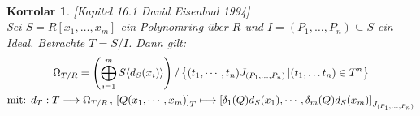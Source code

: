 \documentclass[10pt,a4paper]{report}
\newcommand{\ModulsOfDifferenzials}{David Eisenbud 1994}
\newcounter{Aussage}[chapter]
\newtheorem{korrolar}[Aussage]{Korrolar}
\newcommand{\function}[5]{\nolinebreak{#1:#2 \longrightarrow #3 \, , \, #4 \longmapsto #5}}
\newcommand{\divR}[2]{\Omega_{#1/#2}}
\newcommand{\divf}[1]{d_{#1}}
\begin{document}
\ \\
\newpage
\begin{korrolar}\label{Derivtion mittels Jakobimatrizen} \textit{[Kapitel 16.1 \ModulsOfDifferenzials]}\\
Sei  $S = R[x_1, \dots ,x_m]$ ein Polynomring über $R$ und $I = (P_1,\dots, P_n) \subseteq S$ ein Ideal. Betrachte $T = S/I$. Dann gilt:
\begin{gather*}
\divR{T}{R} = \left( \bigoplus_{i = 1}^m S \langle \divf{S}(x_i) \rangle \right) / \left\lbrace (t_1, \cdots, t_n) J_{(P_1,\dots, P_n)} \, \vert (t_1 , \dots t_n) \in T^n \right\rbrace\\
\text{mit: } 
\function{\divf{T}}{T}{\divR{T}{R}}{\left[Q(x_1,\cdots, x_m)\right]_T}{\left[\delta_1(Q)\divf{S}(x_1), \cdots , \delta_m(Q)\divf{S}(x_m)
\right]_{J_{(P_1 , \dots , P_n)}}}
\end{gather*}
\end{korrolar}
\end{document}
